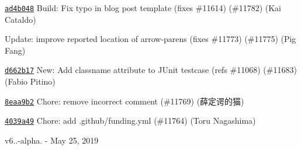 \begin{DoxyItemize}
\item \href{https://github.com/eslint/eslint/commit/ad4b048c6d034cbd7fd97deb4390d059bde8803f}{\texttt{ {\ttfamily ad4b048}}} Build\+: Fix typo in blog post template (fixes \#11614) (\#11782) (Kai Cataldo)
\item \href{https://github.com/eslint/eslint/commit/9590587cef74c936ef9b7ce2d22a71e2fd0fbbc4}{\texttt{ {}}} Update\+: improve reported location of arrow-\/parens (fixes \#11773) (\#11775) (Pig Fang)
\item \href{https://github.com/eslint/eslint/commit/d662b178c7dad193201564d16f7977af2f81ebcf}{\texttt{ {\ttfamily d662b17}}} New\+: Add classname attribute to J\+Unit testcase (refs \#11068) (\#11683) (Fabio Pitino)
\item \href{https://github.com/eslint/eslint/commit/8eaa9b259dc08dfb48269b1e4413d0d47698ed87}{\texttt{ {\ttfamily 8eaa9b2}}} Chore\+: remove incorrect comment (\#11769) (薛定谔的猫)
\item \href{https://github.com/eslint/eslint/commit/4039a49177f2fefacd747050b420c0c4560b7d4b}{\texttt{ {\ttfamily 4039a49}}} Chore\+: add .github/funding.\+yml (\#11764) (Toru Nagashima)
\end{DoxyItemize}

v6..-\/alpha. -\/ May 25, 2019


